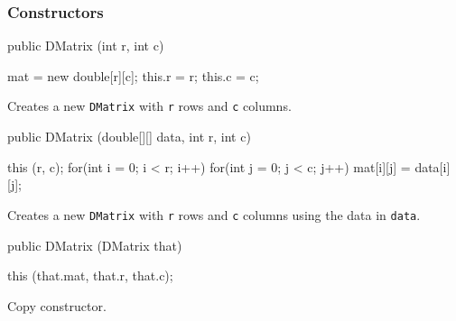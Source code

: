 \subsubsection* {Constructors}

\begin{code}
   public DMatrix (int r, int c) \begin{hide} {
      mat = new double[r][c];
      this.r = r;
      this.c = c;
   } \end{hide}
\end{code}
\begin{tabb} Creates a new \texttt{DMatrix} with \texttt{r} rows and
  \texttt{c} columns.
\end{tabb}
\begin{htmlonly}
\end{htmlonly}
\begin{code}

   public DMatrix (double[][] data, int r, int c) \begin{hide} {
      this (r, c);
      for(int i = 0; i < r; i++)
         for(int j = 0; j < c; j++)
            mat[i][j] = data[i][j];
   } \end{hide}
\end{code}
\begin{tabb} Creates a new \texttt{DMatrix} with \texttt{r} rows and
 \texttt{c} columns using the data in \texttt{data}.
\end{tabb}
\begin{htmlonly}
\end{htmlonly}
\begin{code}

   public DMatrix (DMatrix that) \begin{hide} {
      this (that.mat, that.r, that.c);
   } \end{hide}
\end{code}
\begin{tabb} Copy constructor.
\end{tabb}
\begin{htmlonly}
\end{htmlonly}

